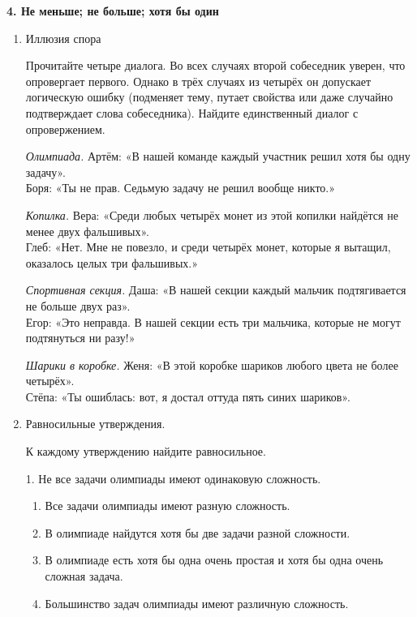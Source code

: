 \begin{center}
    {\large\bfseries 4. Не меньше; не больше; хотя бы один}
\end{center}

\footnotesize

\begin{enumerate}
    \item Иллюзия спора

    Прочитайте четыре диалога. Во всех случаях второй собеседник уверен, что опровергает первого. Однако в трёх случаях из четырёх он допускает логическую ошибку (подменяет тему, путает свойства или даже случайно подтверждает слова собеседника).    
    Найдите единственный диалог с опровержением.

    \vspace{2mm}

    \textit{Олимпиада.} Артём: «В нашей команде каждый участник решил хотя бы одну задачу».\\
    Боря: «Ты не прав. Седьмую задачу не решил вообще никто.»

    \vspace{2mm}

    \textit{Копилка.} Вера: «Среди любых четырёх монет из этой копилки найдётся не менее двух фальшивых».\\
    Глеб: «Нет. Мне не повезло, и среди четырёх монет, которые я вытащил, оказалось целых три фальшивых.»

    \vspace{2mm}

    \textit{Спортивная секция.} Даша: «В нашей секции каждый мальчик подтягивается не больше двух раз».\\
    Егор: «Это неправда. В нашей секции есть три мальчика, которые не могут подтянуться ни разу!»

    \vspace{2mm}

    \textit{Шарики в коробке.} Женя: «В этой коробке шариков любого цвета не более четырёх».\\
    Стёпа: «Ты ошиблась: вот, я достал оттуда пять синих шариков».


    \item Равносильные утверждения.

    К каждому утверждению найдите равносильное.

    1. Не все задачи олимпиады имеют одинаковую сложность.
    \begin{enumerate}
        \item Все задачи олимпиады имеют разную сложность.
        \item В олимпиаде найдутся хотя бы две задачи разной сложности.
        \item В олимпиаде есть хотя бы одна очень простая и хотя бы одна очень сложная задача.
        \item Большинство задач олимпиады имеют различную сложность.
    \end{enumerate}


\end{enumerate}
